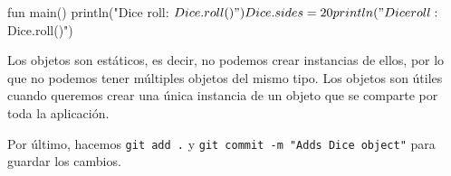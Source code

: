   \begin{kotlin}
    fun main() {
      println("Dice roll: ${Dice.roll()}")
      Dice.sides = 20
      println("Dice roll: ${Dice.roll()}")
    }
  \end{kotlin}

  \begin{important}
    Los objetos son estáticos, es decir, no podemos crear instancias de ellos, por lo que no podemos
    tener múltiples objetos del mismo tipo.
    Los objetos son útiles cuando queremos crear una única instancia de un objeto que se comparte
    por toda la aplicación.
  \end{important}

  Por último, hacemos \texttt{git add .} y \texttt{git commit -m "Adds Dice object"} para 
  guardar los cambios.